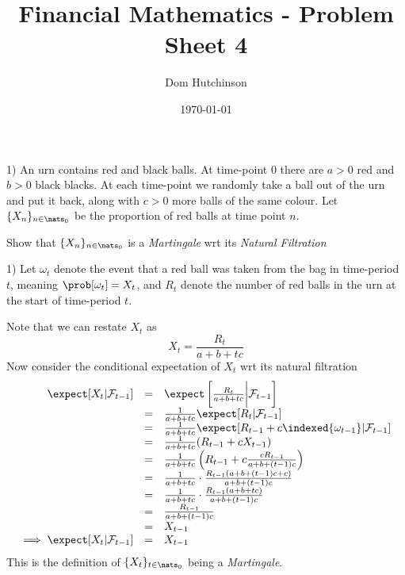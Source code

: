 \documentclass[11pt,a4paper]{article}
\begin{document}
\questionsfalse
\answersfalse

\title{Financial Mathematics - Problem Sheet 4}
\author{Dom Hutchinson}
\date{\today}
\maketitle


\begin{question}{1)}
  An urn contains red and black balls. At time-point 0 there are $a>0$ red and $b>0$ black blacks. At each time-point we randomly take a ball out of the urn and put it back, along with $c>0$ more balls of the same colour. Let $\{X_n\}_{n\in\nats_0}$ be the proportion of red balls at time point $n$.
  \par Show that $\{X_n\}_{n\in\nats_0}$ is a \textit{Martingale} wrt its \textit{Natural Filtration}
\end{question}

\begin{answer}{1)}
  Let $\omega_t$ denote the event that a red ball was taken from the bag in time-period $t$, meaning $\prob[\omega_t]=X_t$, and $R_t$ denote the number of red balls in the urn at the start of time-period $t$.
  \par Note that we can restate $X_t$ as
  \[ X_t=\frac{R_t}{a+b+tc} \]
  Now consider the conditional expectation of $X_t$ wrt its natural filtration
  \[\begin{array}{rcl}
    \expect[X_t|\mathcal{F}_{t-1}]&=&\expect\left[\frac{R_t}{a+b+tc}\bigg|\mathcal{F}_{t-1}\right]\\
    &=&\frac1{a+b+tc}\expect[R_t|\mathcal{F}_{t-1}]\\
    &=&\frac1{a+b+tc}\expect[R_{t-1}+c\indexed\{\omega_{t-1}\}|\mathcal{F}_{t-1}]\\
    &=&\frac1{a+b+tc}(R_{t-1}+cX_{t-1})\\
    &=&\frac1{a+b+tc}\left(R_{t-1}+c\frac{cR_{t-1}}{a+b+(t-1)c}\right)\\
    &=&\frac1{a+b+tc}\cdot\frac{R_{t-1}(a+b+(t-1)c+c)}{a+b+(t-1)c}\\
    &=&\frac1{a+b+tc}\cdot\frac{R_{t-1}(a+b+tc)}{a+b+(t-1)c}\\
    &=&\frac{R_{t-1}}{a+b+(t-1)c}\\
    &=&X_{t-1}\\
    \implies\expect[X_t|\mathcal{F}_{t-1}]&=&X_{t-1}
  \end{array}\]
  This is the definition of $\{X_t\}_{t\in\nats_0}$ being a \textit{Martingale}.
\end{answer}
\end{document}
